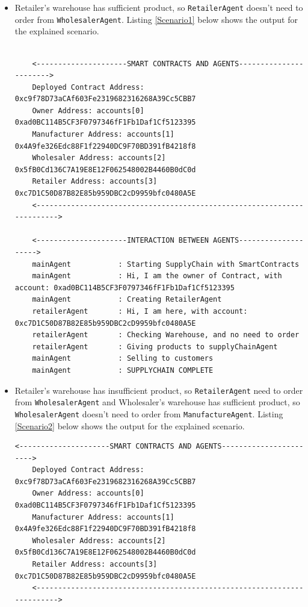 \begin{itemize}
    \item Retailer's warehouse has sufficient product, so \texttt{RetailerAgent} doesn't need to order from \texttt{WholesalerAgent}. Listing \ref{Scenario1} below shows the output for the explained scenario.

    \vspace{.5cm}
    \begin{lstlisting}[caption={Agent Interaction (Scenario 1)},label={Scenario1}, numbers=none, basicstyle=\ttfamily\tiny]
    
    <---------------------SMART CONTRACTS AND AGENTS----------------------->
    Deployed Contract Address: 0xc9f78D73aCAf603Fe2319682316268A39Cc5CBB7
    Owner Address: accounts[0] 0xad0BC114B5CF3F0797346fF1Fb1Daf1Cf5123395
    Manufacturer Address: accounts[1] 0x4A9fe326Edc88F1f22940DC9F70BD391fB4218f8
    Wholesaler Address: accounts[2] 0x5fB0Cd136C7A19E8E12F062548002B4460B0dC0d
    Retailer Address: accounts[3] 0xc7D1C50D87B82E85b959DBC2cD9959bfc0480A5E
    <------------------------------------------------------------------------>
    
    <---------------------INTERACTION BETWEEN AGENTS-------------------->
    mainAgent           : Starting SupplyChain with SmartContracts
    mainAgent           : Hi, I am the owner of Contract, with account: 0xad0BC114B5CF3F0797346fF1Fb1Daf1Cf5123395
    mainAgent           : Creating RetailerAgent
    retailerAgent       : Hi, I am here, with account: 0xc7D1C50D87B82E85b959DBC2cD9959bfc0480A5E
    retailerAgent       : Checking Warehouse, and no need to order
    retailerAgent       : Giving products to supplyChainAgent
    mainAgent           : Selling to customers
    mainAgent           : SUPPLYCHAIN COMPLETE
    \end{lstlisting}
    
    \vspace{.5cm}
    
    \item Retailer's warehouse has insufficient product, so \texttt{RetailerAgent} need to order from \texttt{WholesalerAgent} and Wholesaler's warehouse has sufficient product, so \texttt{WholesalerAgent} doesn't need to order from \texttt{ManufactureAgent}. Listing \ref{Scenario2} below shows the output for the explained scenario.

    \vspace{.5cm}
    \begin{lstlisting}[caption={Agent Interaction (Scenario 2},label={Scenario2},numbers=none, basicstyle=\ttfamily\tiny]
    <---------------------SMART CONTRACTS AND AGENTS----------------------->
    Deployed Contract Address: 0xc9f78D73aCAf603Fe2319682316268A39Cc5CBB7
    Owner Address: accounts[0] 0xad0BC114B5CF3F0797346fF1Fb1Daf1Cf5123395
    Manufacturer Address: accounts[1] 0x4A9fe326Edc88F1f22940DC9F70BD391fB4218f8
    Wholesaler Address: accounts[2] 0x5fB0Cd136C7A19E8E12F062548002B4460B0dC0d
    Retailer Address: accounts[3] 0xc7D1C50D87B82E85b959DBC2cD9959bfc0480A5E
    <------------------------------------------------------------------------>
    

\end{lstlisting}
\end{itemize}
